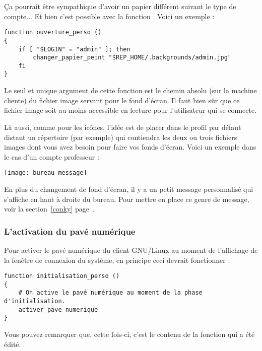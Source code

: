 Ça pourrait être sympathique d'avoir un papier différent
suivant le type de compte... Et bien c'est possible avec la
fonction . Voici un exemple :
%
\begin{lstlisting}[emph={ENTREE},emphstyle={\return}]
function ouverture_perso ()
{
    if [ "$LOGIN" = "admin" ]; then
        changer_papier_peint "$REP_HOME/.backgrounds/admin.jpg"
    fi
}
\end{lstlisting} %
%
Le seul et unique argument de cette fonction est le chemin absolu
(sur la machine cliente) du fichier image servant pour le fond d'écran.
Il faut bien sûr que ce fichier image soit au moins accessible en
lecture pour l'utilisateur qui se connecte.

Là aussi, comme pour les icônes, l'idée est de placer dans le
profil par défaut distant un répertoire 
(par exemple) qui contiendra les deux ou trois fichiers images
dont vous avez besoin pour faire vos fonds d'écran. Voici un
exemple dans le cas d'un compte professeur :
%
\begin{center}
\texttt{[image: bureau-message]}
\end{center}
%
En plus du changement de fond d'écran, il y a un petit message
personnalisé qui s'affiche en haut à droite du bureau.
Pour mettre en place ce genre de message, voir la
section~\ref{conky} page~\pageref{conky}.

\subsubsection{L'activation du pavé numérique}
\label{pave-num}

Pour activer le pavé numérique du client GNU/Linux
au moment de l'affichage de la
fenêtre de connexion du système, en principe ceci devrait
fonctionner :
%
\begin{lstlisting}
function initialisation_perso ()
{
    # On active le pavé numérique au moment de la phase d'initialisation.
    activer_pave_numerique
}
\end{lstlisting}
%
Vous pouvez remarquer que, cette fois-ci, c'est le contenu
de la fonction  qui a été
édité.

